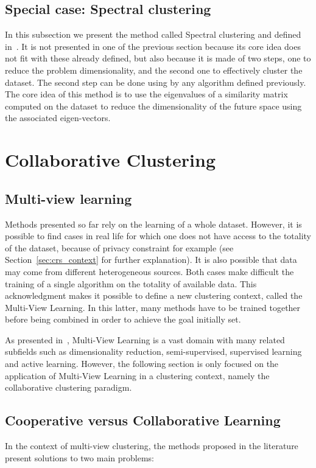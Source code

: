     \subsection{Special case: Spectral clustering}

    In this subsection we present the method called Spectral clustering and defined in~\cite{Ng01onspectral}. It is not presented in one of the previous section because its core idea does not fit with these already defined, but also because it is made of two steps, one to reduce the problem dimensionality, and the second one to effectively cluster the dataset. The second step can be done using by any algorithm defined previously. The core idea of this method is to use the eigenvalues of a similarity matrix computed on the dataset to reduce the dimensionality of the future space using the associated eigen-vectors.


    \section{Collaborative Clustering}
\label{sec:soa_cc}

    \subsection{Multi-view learning}

    Methods presented so far rely on the learning of a whole dataset. However, it is possible to find cases in real life for which one does not have access to the totality of the dataset, because of privacy constraint for example (see Section~\ref{sec:crs_context} for further explanation). It is also possible that data may come from different heterogeneous sources. Both cases make difficult the training of a single algorithm on the totality of available data. This acknowledgment makes it possible to define a new clustering context, called the Multi-View Learning. In this latter, many methods have to be trained together before being combined in order to achieve the goal initially set.
    
    As presented in~\cite{sun2013survey}, Multi-View Learning is a vast domain with many related subfields such as dimensionality reduction, semi-supervised, supervised learning and active learning. However, the following section is only focused on the application of Multi-View Learning in a clustering context, namely the collaborative clustering paradigm.
    
    \subsection{Cooperative versus Collaborative Learning}
    In the context of multi-view clustering, the methods proposed in the literature present solutions to two main problems:

